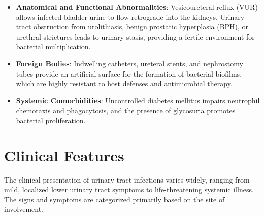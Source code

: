 \begin{itemize}
\begin{itemize}
        \item \textbf{Anatomical and Functional Abnormalities}: Vesicoureteral reflux (VUR) allows infected bladder urine to flow retrograde into the kidneys. Urinary tract obstruction from urolithiasis, benign prostatic hyperplasia (BPH), or urethral strictures leads to urinary stasis, providing a fertile environment for bacterial multiplication.
        \item \textbf{Foreign Bodies}: Indwelling catheters, ureteral stents, and nephrostomy tubes provide an artificial surface for the formation of bacterial biofilms, which are highly resistant to host defenses and antimicrobial therapy.
        \item \textbf{Systemic Comorbidities}: Uncontrolled diabetes mellitus impairs neutrophil chemotaxis and phagocytosis, and the presence of glycosuria promotes bacterial proliferation.
    \end{itemize}
\end{itemize}

\section*{Clinical Features}
The clinical presentation of urinary tract infections varies widely, ranging from mild, localized lower urinary tract symptoms to life-threatening systemic illness. The signs and symptoms are categorized primarily based on the site of involvement.

